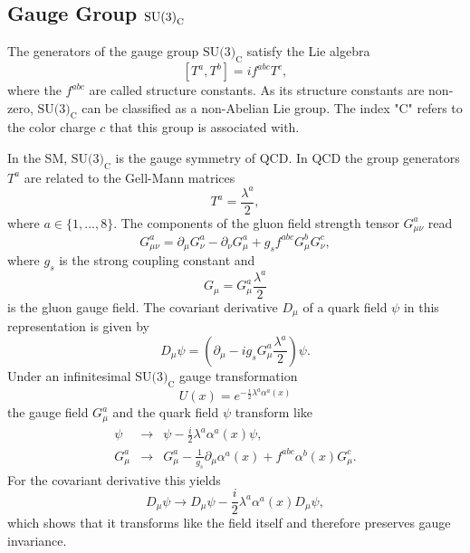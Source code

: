 \documentclass[a4paper,12pt]{book}
\begin{document}
\subsection{Gauge Group $\normalfont \text{SU(3)}_{ \text{C}}$}
The generators of the gauge group $\text{SU(3)}_{ \text{C}}$ satisfy the Lie algebra
\begin{equation}
\label{eq::Lie-algebra}
[T^a,T^b] = i f^{abc} T^c,
\end{equation}
where the $f^{abc}$ are called structure constants. As its structure constants are non-zero, $\text{SU(3)}_{ \text{C}}$ can be classified as a non-Abelian Lie group. The index "C" refers to the color charge $c$ that this group is associated with.\par
In the SM, $\text{SU(3)}_{ \text{C}}$ is the gauge symmetry of QCD. In QCD the group generators $T^a$ are related to the Gell-Mann matrices 
\begin{equation}
T^a = \frac{\lambda^a}{2},
\end{equation}
where $a \in \{1,...,8\}$. The components of the gluon field strength tensor $G_{\mu\nu}^a$ read
\begin{equation}
G_{\mu\nu}^a = \partial_\mu G_\nu^a - \partial_\nu G_\mu^a + g_s f^{abc} G_\mu^b G_\nu^c, 
\end{equation}
where $g_s$ is the strong coupling constant and 
\begin{equation}
G_\mu=G_\mu^a \frac{\lambda^a}{2}
\end{equation} 
is the gluon gauge field. The covariant derivative $D_\mu$ of a quark field $\psi$ in this representation is given by
\begin{equation}
\label{eq::COSU3}
D_\mu \psi = \left(\partial_\mu - i g_s G_\mu^a \frac{\lambda^a}{2}\right)\psi.
\end{equation} 
Under an infinitesimal $\text{SU(3)}_\text{C}$ gauge transformation
\begin{equation}
U(x) = e^{-\frac{i}{2} \lambda^a \alpha^a(x)}
\end{equation}
the gauge field $G_\mu^a$ and the quark field $\psi$ transform like
\begin{eqnarray}
\psi &\rightarrow& \psi -\frac{i}{2} \lambda^a \alpha^a(x) \psi, \\
G_\mu^a &\rightarrow& G_\mu^a - \frac{1}{g_s}\partial_\mu \alpha^a(x)+f^{abc}\alpha^b(x) G_\mu^c.
\end{eqnarray}
For the covariant derivative this yields
\begin{equation}
D_\mu\psi \rightarrow D_\mu\psi -\frac{i}{2} \lambda^a \alpha^a(x)D_\mu\psi,
\end{equation}
which shows that it transforms like the field itself and therefore preserves gauge invariance. 
\end{document}
